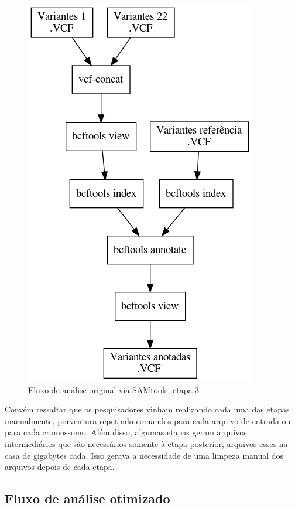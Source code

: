 \documentclass[cic,tc]{iiufrgs}
\begin{document}
\begin{figure}
  \caption{Fluxo de análise original via SAMtools, etapa 3}
    \begin{center}
      \includegraphics[width=0.85\linewidth]{img/stage3_orig.png}
    \end{center}
    \label{fig:stage3_orig}
\end{figure}

Convém ressaltar que os pesquisadores vinham realizando cada uma das etapas
manualmente, porventura repetindo comandos para cada arquivo de entrada ou para
cada cromossomo. Além disso, algumas etapas geram arquivos intermediários que
são necessários somente à etapa posterior, arquivos esses na casa de gigabytes
cada. Isso gerava a necessidade de uma limpeza manual dos arquivos depois de
cada etapa.

\subsection{Fluxo de análise otimizado}
\label{sec:opt}
\end{document}

